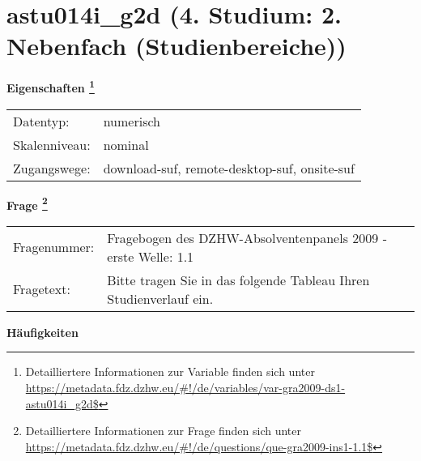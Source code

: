 
    \setcounter{footnote}{0}

    \vspace*{-1.8cm}
	\section{astu014i\_g2d (4. Studium: 2. Nebenfach (Studienbereiche))}
	\label{section:astu014i_g2d}



    \vspace*{0.5cm}
    \noindent\textbf{Eigenschaften
	\footnote{Detailliertere Informationen zur Variable finden sich unter
		\url{https://metadata.fdz.dzhw.eu/\#!/de/variables/var-gra2009-ds1-astu014i_g2d$}}}\\
	\begin{tabularx}{\hsize}{@{}lX}
	Datentyp: & numerisch \\
	Skalenniveau: & nominal \\
	Zugangswege: &
	  download-suf, 
	  remote-desktop-suf, 
	  onsite-suf
 \\
    \end{tabularx}



				\vspace*{0.5cm}
                \noindent\textbf{Frage
	                \footnote{Detailliertere Informationen zur Frage finden sich unter
		              \url{https://metadata.fdz.dzhw.eu/\#!/de/questions/que-gra2009-ins1-1.1$}}}\\
				\begin{tabularx}{\hsize}{@{}lX}
					Fragenummer: &
					  Fragebogen des DZHW-Absolventenpanels 2009 - erste Welle:
					  1.1
 \\
					Fragetext: & Bitte tragen Sie in das folgende Tableau Ihren Studienverlauf ein. \\
				\end{tabularx}





        		\vspace*{0.5cm}
                \noindent\textbf{Häufigkeiten}

